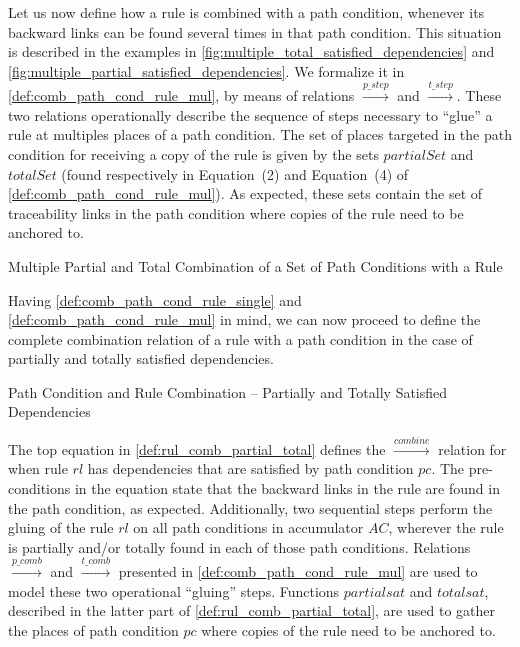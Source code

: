 Let us now define how a rule is combined with a path condition, whenever its backward links can be found several times in that path condition. This situation is described in the examples in \cref{fig:multiple_total_satisfied_dependencies} and \cref{fig:multiple_partial_satisfied_dependencies}. We formalize it in \cref{def:comb_path_cond_rule_mul}, by means of relations $\stackrel{p\_step}{\rightarrow}$ and $\stackrel{t\_step}{\rightarrow}$. These two relations operationally describe the sequence of steps necessary to ``glue'' a rule at multiples places of a path condition. The set of places targeted in the path condition for receiving a copy of the rule is given by the sets $partialSet$ and $totalSet$ (found respectively in Equation~(2) and Equation~(4) of \cref{def:comb_path_cond_rule_mul}). As expected, these sets contain the set of traceability links in the path condition where copies of the rule need to be anchored to.

\begin{definition}{Multiple Partial and Total Combination of a Set of Path Conditions with a Rule\\}
\label{def:comb_path_cond_rule_mul}

\end{definition}

Having \cref{def:comb_path_cond_rule_single} and \cref{def:comb_path_cond_rule_mul} in mind, we can now proceed to define the complete combination relation of a rule with a path condition in the case of partially and totally satisfied dependencies. 

\begin{definition}{Path Condition and Rule Combination -- Partially and Totally Satisfied Dependencies\\}
\label{def:rul_comb_partial_total}

\end{definition}

The top equation in \cref{def:rul_comb_partial_total} defines the $\stackrel{combine}{\rightarrow}$ relation for when rule $rl$ has dependencies that are satisfied by path condition $pc$. The pre-conditions in the equation state that the backward links in the rule are found in the path condition, as expected. Additionally, two sequential steps perform the gluing of the rule $rl$ on all path conditions in accumulator $AC$, wherever the rule is partially and/or totally found in each of those path conditions. Relations $\stackrel{p\_comb}{\rightarrow}$ and $\stackrel{t\_comb}{\rightarrow}$ presented in \cref{def:comb_path_cond_rule_mul} are used to model these two operational ``gluing'' steps. Functions $partialsat$ and $totalsat$, described in the latter part of \cref{def:rul_comb_partial_total}, are used to gather the places of path condition $pc$ where copies of the rule need to be anchored to.


